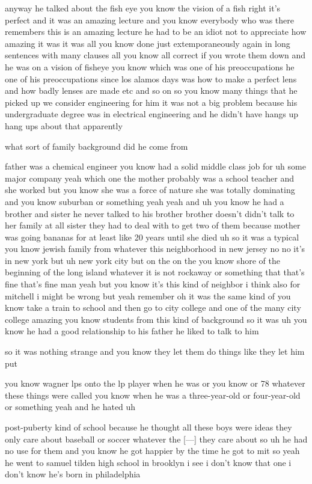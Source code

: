 \begin{description}
anyway he talked about the fish eye you know the vision of a fish right
it's perfect and it was an amazing lecture and you know everybody who was
there remembers this is an amazing lecture he had to be an idiot not to
appreciate how amazing it was it was all you know done just
extemporaneously again in long sentences with many clauses all you know
all correct if you wrote them down and he was on a vision of fisheye you
know which was one of his preoccupations he one of his preoccupations
since los alamos days was how to make a perfect lens and how badly lenses
are made etc and so on so you know many things that he picked up we
consider engineering for him it was not a big problem because his
undergraduate degree was in electrical engineering and he didn't have
hangs up hang ups about that apparently

what sort of family background did he come from

father was a chemical engineer you know had a solid middle class job for uh some major company yeah which one the mother probably was a school teacher and she worked but you know she was a force of nature she was totally dominating and you know suburban or something yeah yeah and uh you know he had a brother and sister he never talked to his brother brother doesn't didn't talk to her family at all sister they had to deal with to get two of them because mother was going bananas for at least like 20 years until she died uh so it was a typical you know jewish family from whatever this neighborhood in new jersey no no it's in new york but uh new york city but on the on the you know shore of the beginning of the long island whatever it is not rockaway or something that that's fine that's fine man yeah but you know it's this kind of neighbor i think also for mitchell i might be wrong but yeah remember oh it was the same kind of you know take a train to school and then go to city college and one of the many city college amazing you know students from this kind of background so it was uh you know he had a good relationship to his father he liked to talk to him

so it was nothing strange and you know they let them do things like they let him put

you know wagner lps onto the lp player when he was or you know or 78 whatever these things were called you know when he was a three-year-old or four-year-old or something yeah and he hated uh

post-puberty kind of school because he thought all these boys were ideas they only care about baseball or soccer whatever the [---] they care about so uh he had no use for them and you know he got happier by the time he got to mit so yeah he went to samuel tilden high school in brooklyn i see i don't know that one i don't know he's born in philadelphia


\end{description}
